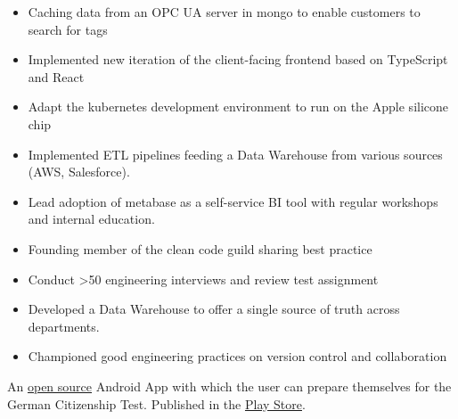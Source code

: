\documentclass[10pt,a4paper,ragged2e,withhyper]{altacv}
\begin{document}
\begin{paracol}{2}

\begin{itemize}
  \item Caching data from an OPC UA server in mongo to enable customers to search for tags
  \item Implemented new iteration of the client-facing frontend based on TypeScript and React
  \item Adapt the kubernetes development environment to run on the Apple silicone chip
  \end{itemize}

\divider

\begin{itemize}
\item Implemented ETL pipelines feeding a Data Warehouse from various sources (AWS, Salesforce).
\item Lead adoption of metabase as a self-service BI tool with regular workshops and internal education.
\item Founding member of the clean code guild sharing best practice
\item Conduct >50 engineering interviews and review test assignment
\end{itemize}

\divider

\begin{itemize}
\item Developed a Data Warehouse to offer a single source of truth across departments.
\item Championed good engineering practices on version control and collaboration
\end{itemize}


An \href{https://github.com/nikolasrieble/AndroidApp_GermanCitizenship}{open source} Android App with which the user can prepare themselves for the German Citizenship Test.
Published in the \href{https://play.google.com/store/apps/details?id=com.nrieble.quizapp}{Play Store}.


\end{paracol}
\end{document}
